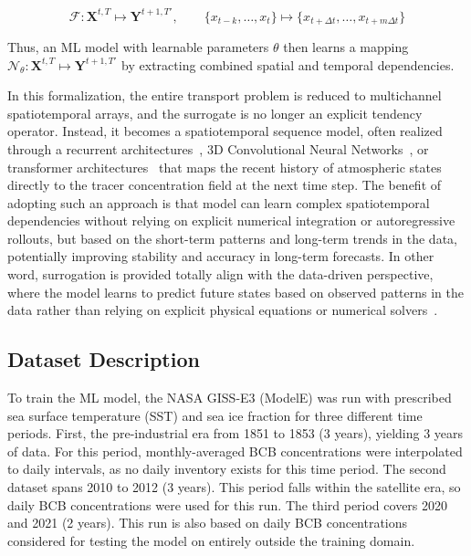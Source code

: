 \documentclass[11pt]{article}
\begin{document}
        \begin{equation}
            \mathcal{F} : \mathbf{X}^{t,T} \mapsto \mathbf{Y}^{t+1,T'}, \qquad
            \{x_{t-k}, \ldots, x_t\} \mapsto \{x_{t+\Delta t}, \ldots, x_{t+m\Delta t}\}
            \label{eq:seq2seq}
        \end{equation}

        \noindent
        Thus, an ML model with learnable parameters $\theta$ then learns a mapping $\mathcal{N}_{\theta} : \mathbf{X}^{t,T} \mapsto \mathbf{Y}^{t+1,T'}$ by extracting combined spatial and temporal dependencies. 
        
        In this formalization, the entire transport problem is reduced to multichannel spatiotemporal arrays, and the surrogate is no longer an explicit tendency operator. Instead, it becomes a spatiotemporal sequence model, often realized through a recurrent architectures~\cite{shi2015convolutional}, 3D Convolutional Neural Networks~\cite{tran2015learning}, or transformer architectures~\cite{bertasius2021timesformer, arnab2021vivit} that maps the recent history of atmospheric states directly to the tracer concentration field at the next time step. The benefit of adopting such an approach is that model can learn complex spatiotemporal dependencies without relying on explicit numerical integration or autoregressive rollouts, but based on the short-term patterns and long-term trends in the data, potentially improving stability and accuracy in long-term forecasts. In other word, surrogation is provided totally align with the data-driven perspective, where the model learns to predict future states based on observed patterns in the data rather than relying on explicit physical equations or numerical solvers~\cite{erfani2026genealogy}.

    \subsection{Dataset Description}
        To train the ML model, the NASA GISS-E3 (ModelE) was run with prescribed sea surface temperature (SST) and sea ice fraction for three different time periods. First, the pre-industrial era from 1851 to 1853 (3 years), yielding 3 years of data. For this period, monthly-averaged BCB concentrations were interpolated to daily intervals, as no daily inventory exists for this time period. The second dataset spans 2010 to 2012 (3 years). This period falls within the satellite era, so daily BCB concentrations were used for this run. The third period covers 2020 and 2021 (2 years). This run is also based on daily BCB concentrations considered for testing the model on entirely outside the training domain.
        
\end{document}

